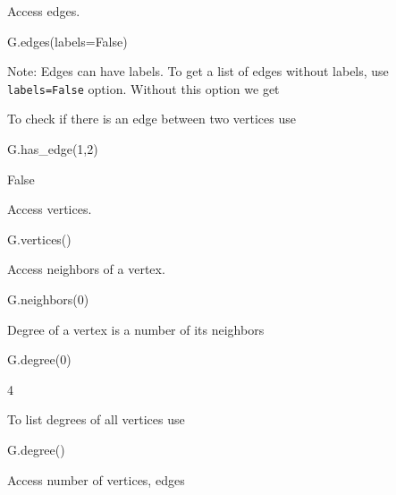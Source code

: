Access edges.
\begin{sageCell}
    G.edges(labels=False)
\end{sageCell}
\begin{outCell}
    [(0,1),(0,2),(0,3),(0,4),(1,6),(2,4),(2,6),(3,6),(4,6),(5,6)]
\end{outCell}
Note: Edges can have labels. To get a list of edges without labels, use \texttt{labels=False} option. Without this option we get
\begin{outCell}
\end{outCell}

To check if there is an edge between two vertices use
\begin{sageCell}
    G.has_edge(1,2)
\end{sageCell}
\begin{outCell}
    False
\end{outCell}

Access vertices.
\begin{sageCell}
    G.vertices()
\end{sageCell}
\begin{outCell}
    [0,1,2,3,4,5,6]
\end{outCell}

Access neighbors of a vertex.
\begin{sageCell}
    G.neighbors(0)
\end{sageCell}
\begin{outCell}
    [1,2,3,4]
\end{outCell}

Degree of a vertex is a number of its neighbors
\begin{sageCell}
    G.degree(0)
\end{sageCell}
\begin{outCell}
    4
\end{outCell}

To list degrees of all vertices use
\begin{sageCell}
    G.degree()
\end{sageCell}
\begin{outCell}
    [4,3,3,2,3,2,5]
\end{outCell}

Access number of vertices, edges
\begin{sageCell}
\end{sageCell}
\begin{outCell}
    [7,10]
\end{outCell}

